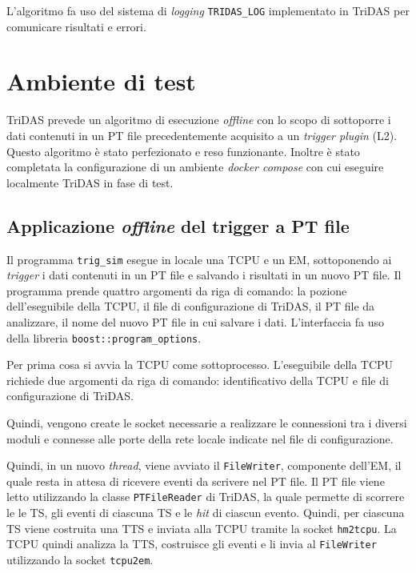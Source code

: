 \documentclass[../main.tex]{subfiles}
\begin{document}
L'algoritmo fa uso del sistema di \emph{logging} \texttt{TRIDAS\_LOG} implementato in TriDAS per comunicare risultati e errori. 

\section{Ambiente di test}
TriDAS prevede un algoritmo di esecuzione \emph{offline} con lo scopo di sottoporre i dati contenuti in un PT file precedentemente acquisito a un \emph{trigger plugin} (L2). Questo algoritmo è stato perfezionato e reso funzionante. Inoltre è stato completata la configurazione di un ambiente \emph{docker compose} con cui eseguire localmente TriDAS in fase di test. 
\subsection{Applicazione \emph{offline} del trigger a PT file}
Il programma \texttt{trig\_sim} esegue in locale una TCPU e un EM, sottoponendo ai \emph{trigger} i dati contenuti in un PT file e salvando i risultati in un nuovo PT file.
Il programma prende quattro argomenti da riga di comando: la pozione dell'eseguibile della TCPU, il file di configurazione di TriDAS, il PT file da analizzare, il nome del nuovo PT file in cui salvare i dati. L'interfaccia fa uso della libreria \texttt{boost::program\_options}.

Per prima cosa si avvia la TCPU come sottoprocesso. L'eseguibile della TCPU richiede due argomenti da riga di comando: identificativo della TCPU e file di configurazione di TriDAS.

Quindi, vengono create le socket necessarie a realizzare le connessioni tra i diversi moduli e connesse alle porte della rete locale indicate nel file di configurazione.


Quindi, in un nuovo \emph{thread}, viene avviato il \texttt{FileWriter}, componente dell'EM, il quale resta in attesa di ricevere eventi da scrivere nel PT file. 
Il PT file viene letto utilizzando la classe \texttt{PTFileReader} di TriDAS, la quale permette di scorrere le le TS, gli eventi di ciascuna TS e le \emph{hit} di ciascun evento. Quindi, per ciascuna TS viene costruita una TTS e inviata alla TCPU tramite la socket \texttt{hm2tcpu}.
La TCPU quindi analizza la TTS, costruisce gli eventi e li invia al \texttt{FileWriter} utilizzando la socket \texttt{tcpu2em}.
\end{document}
